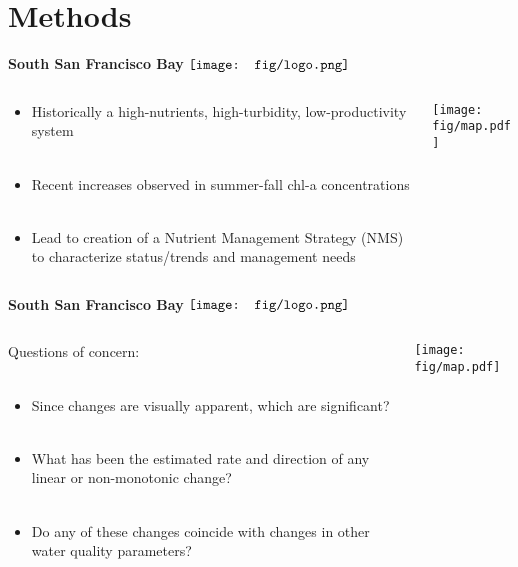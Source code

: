 \documentclass{beamer}
\begin{document}
\section{Methods}

\begin{frame}{\textbf{South San Francisco Bay} \hspace{0pt plus 1 filll} $\vcenter{\hbox{\texttt{[image: fig/logo.png]}}}$}
\begin{columns}
\begin{column}{0.5\textwidth}
\begin{itemize}
\item Historically a high-nutrients, high-turbidity, low-productivity system {\tiny \cite{Cole84,Alpine88}} \\~\\
\item Recent increases observed in summer-fall chl-a concentrations {\tiny \cite{Cloern07,Cloern12b}} \\~\\
\item Lead to creation of a Nutrient Management Strategy (NMS) to characterize status/trends and management needs 
\end{itemize}
\end{column}
\begin{column}{0.5\textwidth}
\centerline{\texttt{[image: fig/map.pdf]}}
\end{column}
\end{columns}
\end{frame}

\begin{frame}{\textbf{South San Francisco Bay} \hspace{0pt plus 1 filll} $\vcenter{\hbox{\texttt{[image: fig/logo.png]}}}$}
\begin{columns}
\begin{column}{0.5\textwidth}
Questions of concern: \\~\\
\begin{itemize}
\item Since changes are visually apparent, which are significant?  \\~\\
\item What has been the estimated rate and direction of any linear or non-monotonic change? \\~\\
\item Do any of these changes coincide with changes in other water quality parameters?
\end{itemize}
\end{column}
\begin{column}{0.5\textwidth}
\centerline{\texttt{[image: fig/map.pdf]}}
\end{column}
\end{columns}
\end{frame}
\end{document}
